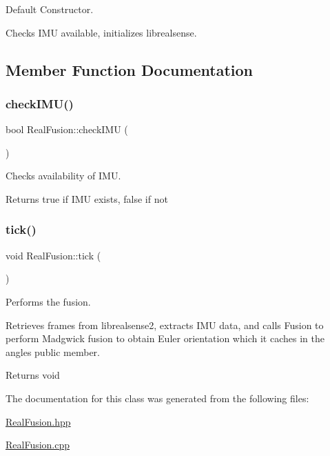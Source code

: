 Default Constructor. 

Checks I\+MU available, initializes librealsense. 

\subsection{Member Function Documentation}
\mbox{\label{classRealFusion_a77329f8bfa4390754ddb1c72b58281ff}} 
\subsubsection{\texorpdfstring{check\+I\+M\+U()}{checkIMU()}}
{\footnotesize\ttfamily bool Real\+Fusion\+::check\+I\+MU (\begin{DoxyParamCaption}{ }\end{DoxyParamCaption})}



Checks availability of I\+MU. 

\begin{DoxyReturn}{Returns}
true if I\+MU exists, false if not 
\end{DoxyReturn}
\mbox{\label{classRealFusion_a0fa5b36d1b32622ec65c41e2c3852c2f}} 
\subsubsection{\texorpdfstring{tick()}{tick()}}
{\footnotesize\ttfamily void Real\+Fusion\+::tick (\begin{DoxyParamCaption}{ }\end{DoxyParamCaption})}



Performs the fusion. 

Retrieves frames from librealsense2, extracts I\+MU data, and calls Fusion to perform Madgwick fusion to obtain Euler orientation which it caches in the angles public member. \begin{DoxyReturn}{Returns}
void 
\end{DoxyReturn}


The documentation for this class was generated from the following files\+:\begin{DoxyCompactItemize}
\item 
\hyperlink{RealFusion_8hpp}{Real\+Fusion.\+hpp}\item 
\hyperlink{RealFusion_8cpp}{Real\+Fusion.\+cpp}\end{DoxyCompactItemize}
